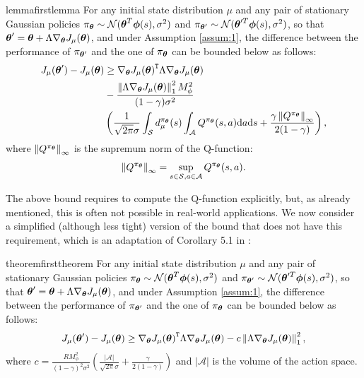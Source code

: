 \begin{restatable}{lemma}{firstlemma}\label{lemma:1}
For any initial state distribution $\mu$ and any pair of stationary Gaussian policies $\pi_{\vtheta} \sim \mathcal{N}(\vtheta^T\boldsymbol{\phi}(s),\sigma^2)$ and $\pi_{\vtheta'} \sim \mathcal{N}(\vtheta'^T\boldsymbol{\phi}(s),\sigma^2)$, so that $\vtheta'=\vtheta+\Lambda\gradJ{\vtheta}$, and under Assumption \ref*{assum:1}, the difference between the performance of $\pi_{\vtheta'}$ and the one of $\pi_ {\vtheta}$ can be bounded below as follows:
\begin{align*}
\DeltaJ &\geq 
	\transpose{\gradJ{\vtheta}}\Lambda\gradJ{\vtheta} \\ 
	&- \frac{\norm[1]{\Lambda\gradJ{\vtheta}}^2 M_{\phi}^2}{(1-\gamma)\sigma^2} \\
		&\left(
		\frac{1}{\sqrt{2\pi}\sigma}\int_{\mathcal{S}}d_{\mu}^{\pi_{\vtheta}}(s)
		\int_{\mathcal{A}}Q^{\pi_{\vtheta}}(s,a)\mathrm{d}a\mathrm{d}s +
		\frac{\gamma \norm[\infty]{Q^{\pi_{\vtheta}}}}{2(1-\gamma)}
		\right),
\end{align*}
where $\norm[\infty]{Q^{\pi_{\vtheta}}}$ is the supremum norm of the Q-function: \[\norm[\infty]{Q^{\pi_{\vtheta}}} = \sup\limits_{s \in \mathcal{S},a \in \mathcal{A}}Q^{\pi_{\vtheta}}(s,a).
\]
\end{restatable}
The above bound requires to compute the Q-function explicitly, but, as already mentioned, this is often not possible in real-world applications. We now consider a simplified (although less tight) version of the bound that does not have this requirement, which is an adaptation of Corollary 5.1 in \cite{NIPS2013_5186}:

\begin{restatable}{theorem}{firsttheorem}\label{theo:1}
For any initial state distribution $\mu$ and any pair of stationary Gaussian policies $\pi_{\vtheta} \sim \mathcal{N}(\vtheta^T\boldsymbol{\phi}(s),\sigma^2)$ and $\pi_{\vtheta'} \sim \mathcal{N}(\vtheta'^T\boldsymbol{\phi}(s),\sigma^2)$, so that $\vtheta'=\vtheta+\Lambda\gradJ{\vtheta}$, and under Assumption \ref*{assum:1}, the difference between the performance of $\pi_{\vtheta'}$ and the one of $\pi_ {\vtheta}$ can be bounded below as follows:
\[
\DeltaJ \geq 
	\transpose{\gradJ{\vtheta}}\Lambda\gradJ{\vtheta} -c\norm[1]{\Lambda\gradJ{\vtheta}}^2,
\]
where $c = \frac{RM_{\phi}^2}{(1-\gamma)^2\sigma^2}\left(\frac{|\mathcal{A}|}{\sqrt{2\pi}\sigma} +	\frac{\gamma}{2(1-\gamma)}\right)$ and $|\mathcal{A}|$ is the volume of the action space.
\end{restatable}


